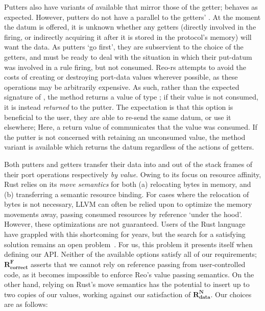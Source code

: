 Putters also have variants of  available that mirror those of the getter;  behaves as expected. However, putters do not have a parallel to the getters' . At the moment the datum is offered, it is unknown whether any getters (directly involved in the firing, or indirectly acquiring it after it is stored in the protocol's memory) will want the data. As putters `go first', they are subservient to the choice of the getters, and must be ready to deal with the situation in which their put-datum was involved in a rule firing, but not consumed. Reo-rs attempts to avoid the costs of creating or destroying port-data values wherever possible, as these operations may be arbitrarily expensive. As such, rather than the expected signature of , the  method returns a value of type ; if their value is not consumed, it is instead \textit{returned} to the putter. The expectation is that this option is beneficial to the user, they are able to re-send the same datum, or use it elsewhere; Here, a return value of  communicates that the value was consumed. If the putter is not concerned with retaining an unconsumed value, the method variant  is available which returns the datum regardless of the actions of getters.


Both putters and getters transfer their data into and out of the stack frames of their port operations respectively \textit{by value}. Owing to its focus on resource affinity, Rust relies on its \textit{move semantics} for both (a) relocating bytes in memory, and (b) transferring a semantic resource binding. For cases where the relocation of bytes is not necessary, LLVM can often be relied upon to optimize the memory movements away, passing consumed resources by reference `under the hood'. However, these optimizations are not guaranteed. Users of the Rust language have grappled with this shortcoming for years, but the search for a satisfying solution remains an open problem~\cite{matsakis_2015}. For us, this problem it presents itself when defining our API. Neither of the available options satisfy all of our requirements; $\boldsymbol{R^F_{correct}}$ asserts that we cannot rely on reference passing from user-controlled code, as it becomes impossible to enforce Reo's value passing semantics. On the other hand, relying on Rust's move semantics has the potential to insert up to two copies of our values, working against our satisfaction of $\boldsymbol{R^N_{data}}$. Our choices are as follows:

